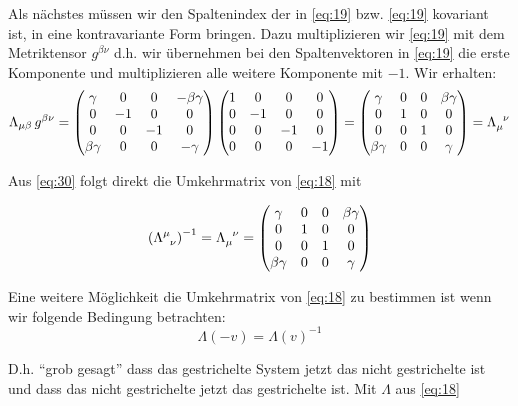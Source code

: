 Als nächstes müssen wir den Spaltenindex der in \eqref{eq:19} bzw. \eqref{eq:19} kovariant ist, in
eine kontravariante Form bringen. Dazu multiplizieren wir \eqref{eq:19} mit dem
Metriktensor \(g^{\beta\nu}\) d.h. wir übernehmen bei den Spaltenvektoren in
\eqref{eq:19} die erste Komponente und multiplizieren alle weitere Komponente
mit \(-1\). Wir erhalten:
\begin{equation}
  \label{eq:30}
   \Lambda_{\mu \beta}\,g^{\beta\nu} =
  \begin{pmatrix}
    \gamma&0&0&-\beta\gamma\\
    0&-1&0&0\\
    0&0&-1&0\\
    \beta\gamma&0&0&-\gamma
  \end{pmatrix}
\begin{pmatrix} 1&0&0&0 \\  0&-1&0&0 \\ 0&0&-1&0 \\ 0&0&0&-1  \end{pmatrix}
 = 
  \begin{pmatrix}
    \gamma&0&0&\beta\gamma\\
    0&1&0&0\\
    0&0&1&0\\
    \beta\gamma&0&0&\gamma
  \end{pmatrix}
=  \Lambda_{\mu}^{\hphantom \mu \nu}
\end{equation}

Aus \eqref{eq:30} folgt direkt die Umkehrmatrix von \eqref{eq:18} mit

\begin{equation}
  \label{eq:31}
   \left(\Lambda^\mu_{\hphantom\mu \nu}\right)^{-1} 
   = \Lambda_{\mu}^{\hphantom \mu \nu}=
  \begin{pmatrix}
    \gamma&0&0&\beta\gamma\\
    0&1&0&0\\
    0&0&1&0\\
    \beta\gamma&0&0&\gamma
  \end{pmatrix}
\end{equation}

Eine weitere Möglichkeit die Umkehrmatrix von \eqref{eq:18} zu bestimmen ist
wenn wir folgende Bedingung betrachten:
\begin{equation}
  \label{eq:32}
  \Lambda(-v) = \Lambda(v)^{-1}
\end{equation}

D.h. ``grob gesagt'' dass das gestrichelte System jetzt das nicht gestrichelte
ist und dass das nicht gestrichelte jetzt das gestrichelte ist. Mit \(\Lambda\)
aus \eqref{eq:18}

